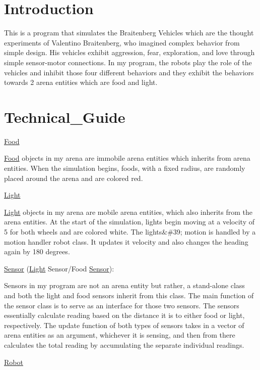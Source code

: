 \hypertarget{index_intro_sec}{}\section{Introduction}\label{index_intro_sec}
This is a program that simulates the Braitenberg Vehicles which are the thought experiments of Valentino Braitenberg, who imagined complex behavior from simple design. His vehicles exhibit aggression, fear, exploration, and love through simple sensor-\/motor connections. In my program, the robots play the role of the vehicles and inhibit those four different behaviors and they exhibit the behaviors towards 2 arena entities which are food and light. \hypertarget{index_Technical_Guide}{}\section{Technical\+\_\+\+Guide}\label{index_Technical_Guide}
\hyperlink{class_food}{Food}

\hyperlink{class_food}{Food} objects in my arena are immobile arena entities which inherits from arena entities. When the simulation begins, foods, with a fixed radius, are randomly placed around the arena and are colored red.

\hyperlink{class_light}{Light}

\hyperlink{class_light}{Light} objects in my arena are mobile arena entities, which also inherits from the arena entities. At the start of the simulation, lights begin moving at a velocity of 5 for both wheels and are colored white. The lights\&\#39; motion is handled by a motion handler robot class. It updates it velocity and also changes the heading again by 180 degrees.

\hyperlink{class_sensor}{Sensor} (\hyperlink{class_light}{Light} Sensor/\+Food \hyperlink{class_sensor}{Sensor})\+:

Sensors in my program are not an arena entity but rather, a stand-\/alone class and both the light and food sensors inherit from this class. The main function of the sensor class is to serve as an interface for those two sensors. The sensors essentially calculate reading based on the distance it is to either food or light, respectively. The update function of both types of sensors takes in a vector of arena entities as an argument, whichever it is sensing, and then from there calculates the total reading by accumulating the separate individual readings.

\hyperlink{class_robot}{Robot}

